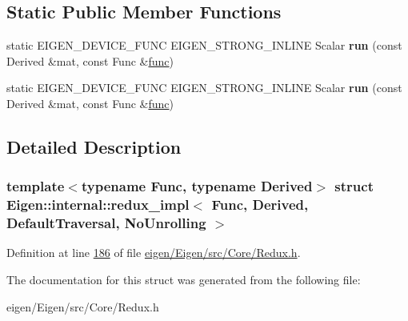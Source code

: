 \subsection*{Static Public Member Functions}
\begin{DoxyCompactItemize}
\item 
\mbox{\label{struct_eigen_1_1internal_1_1redux__impl_3_01_func_00_01_derived_00_01_default_traversal_00_01_no_unrolling_01_4_a693d3faa2e7b55255ccc69d6693c5d04}} 
static E\+I\+G\+E\+N\+\_\+\+D\+E\+V\+I\+C\+E\+\_\+\+F\+U\+NC E\+I\+G\+E\+N\+\_\+\+S\+T\+R\+O\+N\+G\+\_\+\+I\+N\+L\+I\+NE Scalar {\bfseries run} (const Derived \&mat, const Func \&\hyperlink{structfunc}{func})
\item 
\mbox{\label{struct_eigen_1_1internal_1_1redux__impl_3_01_func_00_01_derived_00_01_default_traversal_00_01_no_unrolling_01_4_a693d3faa2e7b55255ccc69d6693c5d04}} 
static E\+I\+G\+E\+N\+\_\+\+D\+E\+V\+I\+C\+E\+\_\+\+F\+U\+NC E\+I\+G\+E\+N\+\_\+\+S\+T\+R\+O\+N\+G\+\_\+\+I\+N\+L\+I\+NE Scalar {\bfseries run} (const Derived \&mat, const Func \&\hyperlink{structfunc}{func})
\end{DoxyCompactItemize}


\subsection{Detailed Description}
\subsubsection*{template$<$typename Func, typename Derived$>$\newline
struct Eigen\+::internal\+::redux\+\_\+impl$<$ Func, Derived, Default\+Traversal, No\+Unrolling $>$}



Definition at line \hyperlink{eigen_2_eigen_2src_2_core_2_redux_8h_source_l00186}{186} of file \hyperlink{eigen_2_eigen_2src_2_core_2_redux_8h_source}{eigen/\+Eigen/src/\+Core/\+Redux.\+h}.



The documentation for this struct was generated from the following file\+:\begin{DoxyCompactItemize}
\item 
eigen/\+Eigen/src/\+Core/\+Redux.\+h\end{DoxyCompactItemize}
